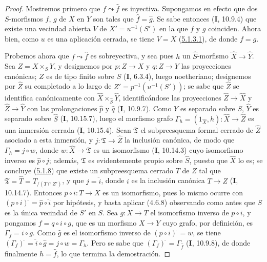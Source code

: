 \begin{proof}
Mostremos primero que $f\leadsto\widehat f$ es inyectiva. Supongamos en efecto que dos
$S$-morfismos $f$, $g$ de $X$ en $Y$ son tales que $\widehat f=\widehat g$.
Se sabe entonces (\textbf{I}, 10.9.4) que existe una vecindad abierta $V$ de
$X'=u^{-1}(S')$ en la que $f$ y $g$ coinciden. Ahora bien, como $u$ es una aplicación
cerrada, se tiene $V=X$ (\hyperref[III.5.1.3.1-fr]{5.1.3.1}), de donde $f=g$.

Probemos ahora que $f\leadsto\widehat f$ es sobreyectiva, y sea pues $h$ un
$\widehat S$-morfismo $\widehat X\to\widehat Y$. Sea $Z=X\times_S Y$, y
designemos por $p:Z\to X$ y $q:Z\to Y$ las proyecciones canónicas; $Z$ es de
tipo finito sobre $S$ (\textbf{I}, 6.3.4), luego noetheriano; designemos por $\widehat Z$ su
completado a lo largo de $Z'=p^{-1}(u^{-1}(S'))$; se sabe que $\widehat Z$ se identifica
canónicamente con $\widehat X\times_{\widehat S}\widehat Y$, identificándose las proyecciones
$\widehat Z\to\widehat X$ y $\widehat Z\to\widehat Y$ con las
prolongaciones $\widehat p$ y $\widehat q$ (\textbf{I}, 10.9.7). Como $Y$ es separado sobre
$S$, $\widehat Y$ es separado sobre $\widehat S$ (\textbf{I}, 10.15.7), luego el morfismo
grafo
$\Gamma_h=(1_{\widehat X},h):\widehat X\to\widehat Z$
es una inmersión cerrada (\textbf{I}, 10.15.4). Sean $\mathfrak T$ el subpreesquema
formal cerrado de $\widehat Z$ asociado a esta inmersión, y
$j:\mathfrak T\to\widehat Z$ la inclusión canónica, de modo que
$\Gamma_h=j\circ w$, donde $w:\widehat X\to\mathfrak T$ es un isomorfismo
(\textbf{I}, 10.14.3) cuyo isomorfismo inverso es $\widehat p\circ j$; además,
$\mathfrak T$ es evidentemente propio sobre $\widehat S$, puesto que $\widehat X$ lo es;
se concluye (\hyperref[III.5.1.8-fr]{5.1.8}) que existe un subpreesquema
cerrado $T$ de $Z$ tal que
$\mathfrak T=\widehat T=T_{/(T\cap Z')}$, y que $j=\widehat i$, donde $i$ es
la inclusión canónica $T\to Z$ (\textbf{I}, 10.14.7). Entonces $p\circ i:T\to X$ es un
isomorfismo, pues lo mismo ocurre con
$(p\circ i)^{\widehat{\,}}=\widehat p\circ\widehat i$ por hipótesis, y basta
aplicar
(4.6.8) observando como antes que $S$ es la única vecindad de $S'$ en $S$.
Sea $g:X\to T$ el isomorfismo inverso de $p\circ i$, y pongamos
$f=q\circ i\circ g$, que es un morfismo $X\to Y$ cuyo grafo, por definición, es
$\Gamma_f=i\circ g$. Como $\widehat g$ es el isomorfismo inverso de
$(p\circ i)^{\widehat{\,}}=w$, se tiene
$(\Gamma_f)^{\widehat{\,}}=\widehat i\circ\widehat g=j\circ w=\Gamma_h$.
Pero se sabe que $(\Gamma_f)^{\widehat{\,}}=\Gamma_{\widehat f}$ (\textbf{I}, 10.9.8), de donde
finalmente $h=\widehat f$, lo que termina la demostración.
\end{proof}

